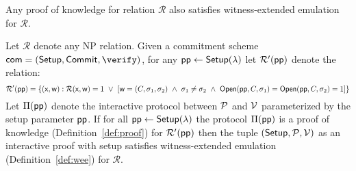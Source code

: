 \begin{lemma}\label{lem:wee}
	Any proof of knowledge for relation $\mathcal{R}$ also satisfies witness-extended emulation for $\mathcal{R}$.  
\end{lemma}

\begin{lemma}\label{lem:weecommit}

Let $\mathcal{R}$ denote any NP relation. Given a commitment scheme $\textsf{com} = (\setup, \commit, \verify)$, for any $\textsf{pp} \gets \textsf{{Setup}}(\lambda)$ let $\mathcal{R}'(\textsf{pp})$ denote the relation: 
$$\mathcal{R'}(\crs) = \{(\mathsf{x}, \mathsf{w}): \mathcal{R}(\mathsf{x}, \mathsf{w}) = 1 \  \vee \ \left[ \mathsf{w} = (C, \sigma_1, \sigma_2) \ \wedge \ \sigma_1 \neq \sigma_2 \ \wedge \ \open(\crs, C, \sigma_1) = \open(\crs, C, \sigma_2) = 1 \right]   \} $$
Let $\Pi(\textsf{pp})$ denote the interactive protocol between $\mathcal{P}$ and $\mathcal{V}$ parameterized by the setup parameter $\textsf{pp}$. If for all $\textsf{pp} \gets  \textsf{{Setup}}(\lambda)$ the protocol $\Pi(\textsf{pp})$ is a proof of knowledge (Definition~\ref{def:proof}) for $\mathcal{R}'(\textsf{pp})$ then the tuple $(\textsf{{Setup}}, \mathcal{P}, \mathcal{V})$ as an interactive proof with setup satisfies witness-extended emulation (Definition~\ref{def:wee}) for $\mathcal{R}$. 	
\end{lemma}

